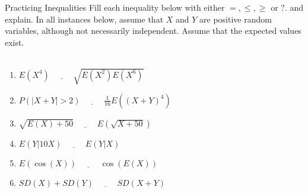 \documentclass[11.5pt]{article}
\begin{document}

\begin{exercise}{Practicing Inequalities}
Fill each inequality below with either $=, \le, \ge$ or $?$. and explain. In all instances below, assume that $X$ and $Y$ are positive random variables, although not necessarily independent. Assume that the expected values exist. \\ \\
\begin{enumerate} \itemsep 1.13cm
	\item $E(X^4) \ \underline{\hspace{1cm}} \ \sqrt{E(X^2)E(X^6)}$
	\item $P(|X+Y| > 2)  \ \underline{\hspace{1cm}} \ \frac{1}{16}E((X+Y)^4)$
	\item $\sqrt{E(X)+50}  \ \underline{\hspace{1cm}} \  E(\sqrt{X+50})$
	\item $E(Y|10X)  \ \underline{\hspace{1cm}} \  E(Y|X)$
	\item $E(\cos(X))  \ \underline{\hspace{1cm}} \  \cos(E(X))$
	\item $SD(X) + SD(Y) \ \underline{\hspace{1cm}} \ SD(X+Y)$
\end{enumerate}
\end{exercise}
\end{document}
